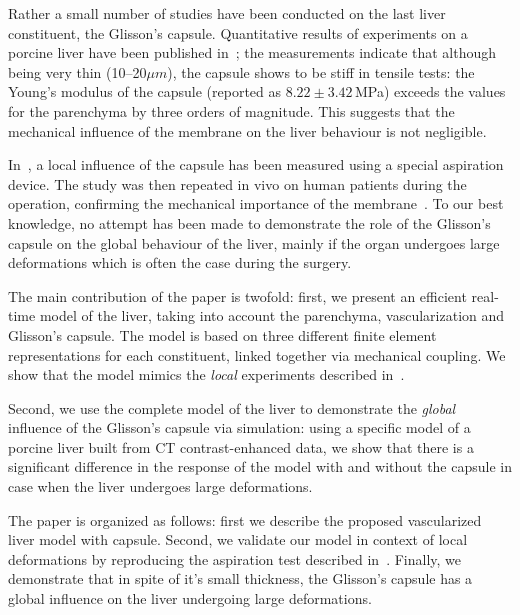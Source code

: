 \documentclass{llncs}
\begin{document}
Rather a small number of studies have been conducted on the last liver constituent, the  Glisson's capsule.
Quantitative results of experiments on a porcine liver have been published in~\cite{Umale2011}; the measurements indicate that although being very 
thin (10--20$\mu m$), the capsule shows to be stiff in tensile tests: the Young's modulus of the capsule (reported as $8.22\pm3.42$\,MPa) 
exceeds the values for the parenchyma by three orders of magnitude.
This suggests that the mechanical influence of the membrane on the liver behaviour is not negligible.

In~\cite{Hollenstein2006}, a local influence of the capsule has been measured using a special aspiration device. The study was then repeated 
in vivo on human patients during the operation, confirming the mechanical importance of the membrane~\cite{Ahn2010,Nava2008}.
To our best knowledge, no attempt has been made to demonstrate the role of the Glisson's capsule on the global behaviour of 
the liver, mainly if the organ undergoes large deformations which is often the case during the surgery.

The main contribution of the paper is twofold: first, we present an efficient real-time model of the liver, taking into account 
the parenchyma, vascularization and Glisson's capsule. The model is based on three different finite element representations for each constituent,
linked together via mechanical coupling. We show that the model mimics the \emph{local} experiments described in~\cite{Hollenstein2006}.
 
Second, we use the complete model of the liver to demonstrate the \emph{global} influence of the Glisson's
capsule via simulation: using a specific model of a porcine liver built from CT contrast-enhanced data, we show that there is a significant 
difference in the response of the model with and without the capsule in case when the liver undergoes large deformations. 

The paper is organized as follows: first we describe the proposed vascularized
liver model with capsule. Second, we validate our model in context of local deformations by reproducing the aspiration test 
described in~\cite{Hollenstein2006}. Finally, we demonstrate that in spite of it's small thickness, the Glisson's 
capsule has a global influence on the liver undergoing large deformations. 

\end{document}
